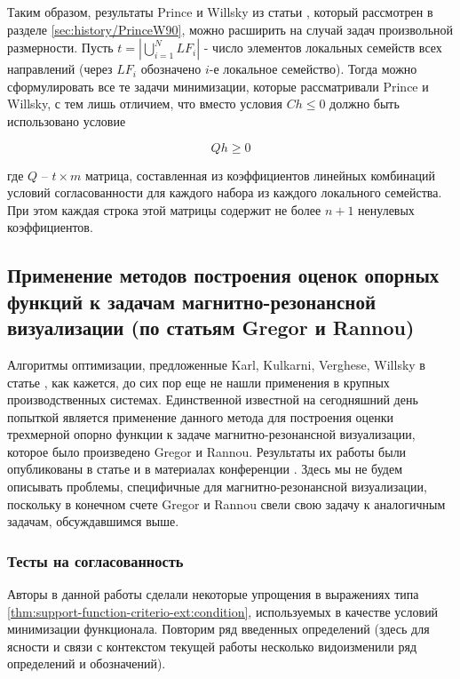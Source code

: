 \documentclass[a4paper, 12pt, titlepage]{article}
\theoremstyle{definition}
\theoremstyle{plain}
\theoremstyle{plain}
\begin{document}
Таким образом, результаты Prince и Willsky из
статьи \cite{journals/pami/PrinceW90}, который рассмотрен в разделе
\ref{sec:history/PrinceW90}, можно расширить на случай задач произвольной
размерности. Пусть $t = |\bigcup \limits_{i = 1}^{N} LF_{i}|$ - число элементов
локальных семейств всех направлений (через $LF_{i}$ обозначено $i$-е локальное 
семейство). Тогда можно сформулировать все те задачи минимизации, которые
рассматривали Prince и Willsky, с тем лишь отличием, что вместо условия
$Ch \leq 0$ должно быть использовано условие

\begin{equation}
 Q h \geq 0
\end{equation}

где $Q$ -- $t \times m$ матрица, составленная из коэффициентов линейных
комбинаций условий согласованности для каждого набора из каждого локального
семейства. При этом каждая строка этой матрицы содержит не более $n + 1$
ненулевых коэффициентов.

\newpage
\subsection{Применение методов построения оценок опорных функций к задачам
магнитно-резонансной визуализации (по статьям Gregor и Rannou)}

Алгоритмы оптимизации, предложенные Karl, Kulkarni, Verghese, Willsky в статье
\cite{journals/jmiv/KarlKVW96}, как кажется, до сих пор еще не нашли применения
в крупных производственных системах. Единственной известной на
сегодняшний день попыткой является применение данного метода для построения
оценки трехмерной опорно функции к задаче магнитно-резонансной визуализации,
которое было произведено Gregor и Rannou. Результаты их работы были
опубликованы в статье \cite{journals/ijist/GregorR2002} и в материалах
конференции \cite{conf/spie/GregorR2001}. Здесь мы не будем описывать
проблемы, специфичные для магнитно-резонансной визуализации, поскольку в
конечном счете Gregor и Rannou свели свою задачу к аналогичным задачам,
обсуждавшимся выше.

\subsubsection{Тесты на согласованность}

Авторы в данной работы сделали некоторые упрощения в выражениях типа
\ref{thm:support-function-criterio-ext:condition}, используемых в качестве
условий минимизации функционала. Повторим ряд введенных определений (здесь для 
ясности и связи с контекстом текущей работы несколько видоизменили ряд 
определений и обозначений).
\end{document}
